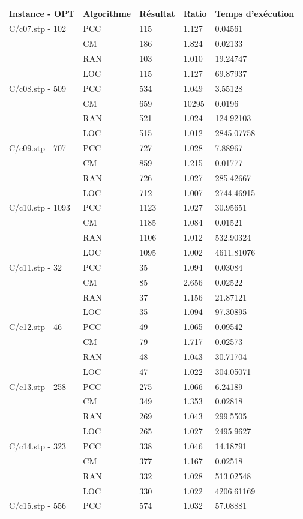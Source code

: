 \documentclass[12pt,a4paper]{article}
\begin{document}
\begin{center}
	\begin{tabular}{l|l|l|l|l}
		Instance - OPT & Algorithme & Résultat & Ratio & Temps d'exécution\\ \hline \hline
		C/c07.stp - 102&PCC&115&1.127&0.04561\\
		&CM&186&1.824&0.02133\\
		&RAN&103&1.010&19.24747\\
		&LOC&115&1.127&69.87937\\\hline
		C/c08.stp - 509&PCC&534&1.049&3.55128\\
		&CM&659&10295&0.0196\\
		&RAN&521&1.024&124.92103\\
		&LOC&515&1.012&2845.07758\\\hline
		C/c09.stp - 707&PCC&727&1.028&7.88967\\
		&CM&859&1.215&0.01777\\
		&RAN&726&1.027&285.42667\\
		&LOC&712&1.007&2744.46915\\\hline
		C/c10.stp - 1093&PCC&1123&1.027&30.95651\\
		&CM&1185&1.084&0.01521\\
		&RAN&1106&1.012&532.90324\\
		&LOC&1095&1.002&4611.81076\\\hline
		C/c11.stp - 32&PCC&35&1.094&0.03084\\
		&CM&85&2.656&0.02522\\
		&RAN&37&1.156&21.87121\\
		&LOC&35&1.094&97.30895\\\hline
		C/c12.stp - 46&PCC&49&1.065&0.09542\\
		&CM&79&1.717&0.02573\\
		&RAN&48&1.043&30.71704\\
		&LOC&47&1.022&304.05071\\\hline
		C/c13.stp - 258&PCC&275&1.066&6.24189\\
		&CM&349&1.353&0.02818\\
		&RAN&269&1.043&299.5505\\
		&LOC&265&1.027&2495.9627\\\hline
		C/c14.stp - 323&PCC&338&1.046&14.18791\\
		&CM&377&1.167&0.02518\\
		&RAN&332&1.028&513.02548\\
		&LOC&330&1.022&4206.61169\\\hline
		C/c15.stp - 556&PCC&574&1.032&57.08881\\

\end{tabular}
\end{center}
\end{document}
